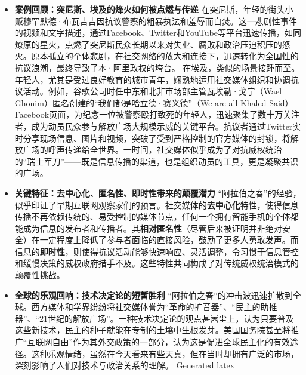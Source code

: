 \documentclass[UTF8, 10pt]{ctexbook}
\begin{document}
\begin{itemize}
    \item \textbf{案例回顾：突尼斯、埃及的烽火如何被点燃与传递}
    在突尼斯，年轻的街头小贩穆罕默德·布瓦吉吉因抗议警察的粗暴执法和羞辱而自焚。这一悲剧性事件的视频和文字描述，通过Facebook、Twitter和YouTube等平台迅速传播，如同燎原的星火，点燃了突尼斯民众长期以来对失业、腐败和政治压迫积压的怒火。原本孤立的个体悲剧，在社交网络的放大和连接下，迅速转化为全国性的抗议浪潮，最终导致了本·阿里政权的垮台。
    在埃及，类似的场景接踵而至。年轻人，尤其是受过良好教育的城市青年，娴熟地运用社交媒体组织和协调抗议活动。例如，谷歌公司时任中东和北非市场部主管瓦埃勒·戈宁（Wael Ghonim）匿名创建的“我们都是哈立德·赛义德”（We are all Khaled Said）Facebook页面，为纪念一位被警察殴打致死的年轻人，迅速聚集了数十万关注者，成为动员民众参与解放广场大规模示威的关键平台。抗议者通过Twitter实时分享现场信息、图片和视频，突破了受到严格控制的官方媒体的封锁，将解放广场的呼声传递给全世界。一时间，社交媒体似乎成为了对抗威权统治的“瑞士军刀”——既是信息传播的渠道，也是组织动员的工具，更是凝聚共识的广场。

    \item \textbf{关键特征：去中心化、匿名性、即时性带来的颠覆潜力}
    “阿拉伯之春”的经验，似乎印证了早期互联网观察家们的预言。社交媒体的\textbf{去中心化}特性，使得信息传播不再依赖传统的、易受控制的媒体节点，任何一个拥有智能手机的个体都能成为信息的发布者和传播者。其\textbf{相对匿名性}（尽管后来被证明并非绝对安全）在一定程度上降低了参与者面临的直接风险，鼓励了更多人勇敢发声。而信息的\textbf{即时性}，则使得抗议活动能够快速响应、灵活调整，令习惯于信息管控和缓慢决策的威权政府措手不及。这些特性共同构成了对传统威权统治模式的颠覆性挑战。

    \item \textbf{全球的乐观回响：技术决定论的短暂胜利}
    “阿拉伯之春”的冲击波迅速扩散到全球。西方媒体和学界纷纷将社交媒体誉为“革命的扩音器”、“民主的助推器”、“21世纪的解放广场”。一种技术决定论的观点甚嚣尘上，认为只要普及这些新技术，民主的种子就能在专制的土壤中生根发芽。美国国务院甚至将推广“互联网自由”作为其外交政策的一部分，认为这是促进全球民主化的有效途径。这种乐观情绪，虽然在今天看来有些天真，但在当时却拥有广泛的市场，深刻影响了人们对技术与政治关系的理解。
Generated latex
\end{itemize}
\end{document}
